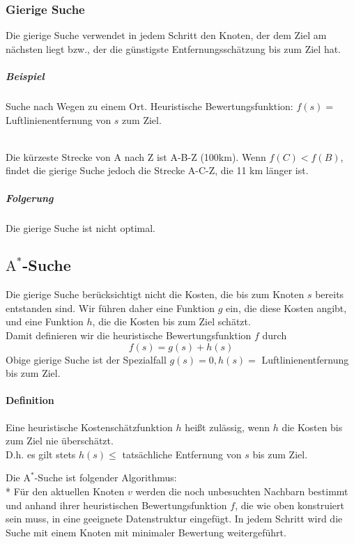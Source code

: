 \documentclass[a4paper]{scrartcl}
\begin{document}
\subsubsection{Gierige Suche}
Die gierige Suche verwendet in jedem Schritt den Knoten, der dem Ziel am nächsten liegt bzw., der die günstigste Entfernungsschätzung bis zum Ziel hat.
\subparagraph{Beispiel} Suche nach Wegen zu einem Ort.
Heuristische Bewertungsfunktion: $f(s) =$ Luftlinienentfernung von $s$ zum Ziel.\\
\\
Die kürzeste Strecke von A nach Z ist A-B-Z (100km). Wenn $f(C) < f(B)$, findet die gierige Suche jedoch die Strecke A-C-Z, die 11 km länger ist. 
\subparagraph{Folgerung} Die gierige Suche ist nicht optimal.

\subsection{$\text{A}^*$-Suche}
Die gierige Suche berücksichtigt nicht die Kosten, die bis zum Knoten $s$ bereits entstanden sind. Wir führen daher eine Funktion $g$ ein, die diese Kosten angibt, und eine Funktion $h$, die die Kosten bis zum Ziel schätzt.\\
Damit definieren wir die heuristische Bewertungsfunktion $f$ durch \[f(s) = g(s) + h(s)\]
Obige gierige Suche ist der Spezialfall $g(s) = 0, h(s) =$ Luftlinienentfernung bis zum Ziel.

\paragraph{Definition} Eine heuristische Kostenschätzfunktion $h$ heißt zulässig, wenn $h$ die Kosten bis zum Ziel nie überschätzt.\\
D.h. es gilt stets $h(s) \leq$ tatsächliche Entfernung von $s$ bis zum Ziel.

Die $\text{A}^*$-Suche ist folgender Algorithmus:\\*
Für den aktuellen Knoten $v$ werden die noch unbesuchten Nachbarn bestimmt und anhand ihrer heuristischen Bewertungsfunktion $f$, die wie oben konstruiert sein muss, in eine geeignete Datenstruktur eingefügt. In jedem Schritt wird die Suche mit einem Knoten mit minimaler Bewertung weitergeführt.
\end{document}
